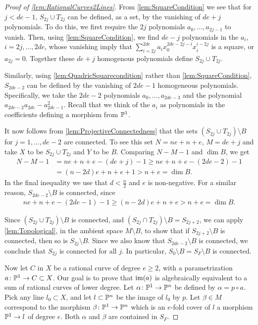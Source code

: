 \begin{proof}[Proof of \cref{lem:RationalCurves2Lines}]
From \cref{lem:SquareCondition} we see that for $j < de-1$, $S_{2j} \cup T_{2j}$ can be defined, as a set, by the vanishing of $de+j$ polynomials. To do this, we first require the $2j$ polynomials $a_0,\dots,a_{2j-1}$ to vanish. Then, using \cref{lem:SquareCondition}, we find $de-j$ polynomials in the $a_i$, $i = 2j,\dots,2de$, whose vanishing imply that $\sum_{i=2j}^{2de}a_ix_0^{2de-2j-i}x_i^{i-2j}$ is a square, or $a_{2j} = 0$. Together these $de+j$ homogenous polynomials define $S_{2j} \cup T_{2j}$. 

Similarly, using \cref{lem:QuadricSquarecondition} rather than \cref{lem:SquareCondition}, $S_{2de-2}$ can be defined by the vanishing of $2de-1$ homogeneous polynomials. Specifically, we take the $2de-2$ polynomials $a_0,\dots,a_{2de-3}$ and the polynomial $a_{2de-2}a_{2de}-a_{2de-1}^2$. Recall that we think of the $a_i$ as polynomials in the coefficients defining a morphism from $\P^1$.

It now follows from \cref{lem:ProjectiveConnectedness} that the sets $(S_{2j}\cup T_{2j}) \setminus B$ for $j = 1,\dots,de-2$ are connected. To see this set $N = ne + n + e$, $M = de+j$ and take $X$ to be $S_{2j}\cup T_{2j}$ and $Y$ to be $B$. Comparing $N-M-1$ and $\dim B$, we get
\begin{align*}
  N-M-1 &= ne + n + e - (de+j) - 1 \geq ne + n + e - (2de-2) - 1\\
 &=  (n-2d)e + n + e + 1 > n+e = \dim B.
\end{align*}
In the final inequality we use that $d < \frac{n}{2}$ and $e$ is non-negative.
For a similar reason, $S_{2de-2} \setminus B$ is connected, since
\begin{align*}
  ne + n + e - (2de-1) - 1 \geq (n-2d)e + n + e > n+e = \dim B.
\end{align*}

Since $(S_{2j}\cup T_{2j}) \setminus B$ is connected, and $(S_{2j}\cap T_{2j})\setminus B = S_{2j+2}$, we can apply \cref{lem:Topological}, in the ambient space $M \setminus B$, to show that if $S_{2j+2} \setminus B$ is connected, then so is $S_{2j}\setminus B$. Since we also know that $S_{2de-2} \setminus B$ is connected, we conclude that $S_{2j}$ is connected for all $j$. In particular, $S_0 \setminus B = S_F \setminus B$ is connected.

Now let $C$ in $X$ be a rational curve of degree $e \geq 2$, with a parametrization $a \from \P^1 \to C \subset X$. Our goal is to prove that $\im(a)$ is algebraically equivalent to a sum of rational curves of lower degree. Let $\alpha \from \P^1 \to \P^n$ be defined by $\alpha = p \circ a$. Pick any line $l_0 \subset X$, and let $l \subset \P^n$ be the image of $l_0$ by $p$. Let $\beta \in M$ correspond to the morphism $\beta \from \P^1 \to \P^n$ which is an $e$-fold cover of $l$ \ie a morphism $\P^1 \to l$ of degree $e$. Both $\alpha$ and $\beta$ are contained in $S_F$.


\end{proof}
